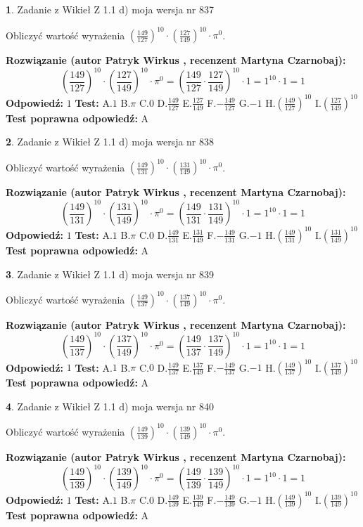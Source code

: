 \documentclass[12pt, a4paper]{article}
\theoremstyle{definition} %
\newtheorem{zad}{}
\newcommand{\zadStart}[1]{\begin{zad}#1\newline}
\newcommand{\zadStop}{\end{zad}}
\newcommand{\rozwStart}[2]{\noindent \textbf{Rozwiązanie (autor #1 , recenzent #2): }\newline}
\newcommand{\rozwStop}{\newline}
\newcommand{\odpStart}{\noindent \textbf{Odpowiedź:}\newline}
\newcommand{\odpStop}{\newline}
\newcommand{\testStart}{\noindent \textbf{Test:}\newline}
\newcommand{\testStop}{\newline}
\newcommand{\kluczStart}{\noindent \textbf{Test poprawna odpowiedź:}\newline}
\newcommand{\kluczStop}{\newline}
\begin{document}
\zadStart{Zadanie z Wikieł Z 1.1 d) moja wersja nr 837}

Obliczyć wartość wyrażenia $(\frac{149}{127})^{10} \cdot (\frac{127}{149})^{10} \cdot \pi^{0}$.
\zadStop
\rozwStart{Patryk Wirkus}{Martyna Czarnobaj}
$$(\frac{149}{127})^{10} \cdot (\frac{127}{149})^{10} \cdot \pi^{0} = (\frac{149}{127} \cdot \frac{127}{149})^{10} \cdot 1 = 1^{10} \cdot 1 = 1$$
\rozwStop
\odpStart
$1$
\odpStop
\testStart
A.$1$ B.$\pi$ C.$0$ D.$\frac{149}{127}$ E.$\frac{127}{149}$
F.$-\frac{149}{127}$ G.$-1$
H.$(\frac{149}{127})^{10}$
I.$(\frac{127}{149})^{10}$
\testStop
\kluczStart
A
\kluczStop



\zadStart{Zadanie z Wikieł Z 1.1 d) moja wersja nr 838}

Obliczyć wartość wyrażenia $(\frac{149}{131})^{10} \cdot (\frac{131}{149})^{10} \cdot \pi^{0}$.
\zadStop
\rozwStart{Patryk Wirkus}{Martyna Czarnobaj}
$$(\frac{149}{131})^{10} \cdot (\frac{131}{149})^{10} \cdot \pi^{0} = (\frac{149}{131} \cdot \frac{131}{149})^{10} \cdot 1 = 1^{10} \cdot 1 = 1$$
\rozwStop
\odpStart
$1$
\odpStop
\testStart
A.$1$ B.$\pi$ C.$0$ D.$\frac{149}{131}$ E.$\frac{131}{149}$
F.$-\frac{149}{131}$ G.$-1$
H.$(\frac{149}{131})^{10}$
I.$(\frac{131}{149})^{10}$
\testStop
\kluczStart
A
\kluczStop



\zadStart{Zadanie z Wikieł Z 1.1 d) moja wersja nr 839}

Obliczyć wartość wyrażenia $(\frac{149}{137})^{10} \cdot (\frac{137}{149})^{10} \cdot \pi^{0}$.
\zadStop
\rozwStart{Patryk Wirkus}{Martyna Czarnobaj}
$$(\frac{149}{137})^{10} \cdot (\frac{137}{149})^{10} \cdot \pi^{0} = (\frac{149}{137} \cdot \frac{137}{149})^{10} \cdot 1 = 1^{10} \cdot 1 = 1$$
\rozwStop
\odpStart
$1$
\odpStop
\testStart
A.$1$ B.$\pi$ C.$0$ D.$\frac{149}{137}$ E.$\frac{137}{149}$
F.$-\frac{149}{137}$ G.$-1$
H.$(\frac{149}{137})^{10}$
I.$(\frac{137}{149})^{10}$
\testStop
\kluczStart
A
\kluczStop



\zadStart{Zadanie z Wikieł Z 1.1 d) moja wersja nr 840}

Obliczyć wartość wyrażenia $(\frac{149}{139})^{10} \cdot (\frac{139}{149})^{10} \cdot \pi^{0}$.
\zadStop
\rozwStart{Patryk Wirkus}{Martyna Czarnobaj}
$$(\frac{149}{139})^{10} \cdot (\frac{139}{149})^{10} \cdot \pi^{0} = (\frac{149}{139} \cdot \frac{139}{149})^{10} \cdot 1 = 1^{10} \cdot 1 = 1$$
\rozwStop
\odpStart
$1$
\odpStop
\testStart
A.$1$ B.$\pi$ C.$0$ D.$\frac{149}{139}$ E.$\frac{139}{149}$
F.$-\frac{149}{139}$ G.$-1$
H.$(\frac{149}{139})^{10}$
I.$(\frac{139}{149})^{10}$
\testStop
\kluczStart
A
\kluczStop
\end{document}
